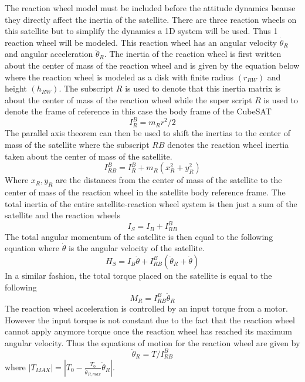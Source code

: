\documentclass{article}
\begin{document}
The reaction wheel model must be included before the attitude dynamics
beause they directly affect the inertia of the satellite. There are
three reaction wheels on this satellite but to simplify the dynamics a
1D system will be used. Thus 1 reaction wheel will be modeled. This
reaction wheel has an angular velocity $\dot{\theta}_{R}$ and angular acceleration
$\ddot{\theta}_{R}$. The inertia of the reaction wheel is first written
about the center of mass of the reaction wheel and is given by the
equation below where the reaction wheel is modeled as a disk with
finite radius $(r_{RW})$ and height $(h_{RW})$. The subscript $R$ is used to
denote that this inertia matrix is about the center of mass of the
reaction wheel while the super script $R$ is used to denote the frame
of reference in this case the body frame of the CubeSAT 
\begin{equation}
  I^{B}_{R} = m_{R}r^2/2
\end{equation}
The parallel axis theorem can then be used to shift the inertias to
the center of mass of the satellite where the subscript $RB$ denotes
the reaction wheel inertia taken about the center of mass of the
satellite. 
\begin{equation}
  I^{B}_{RB} = I^{B}_{R} + m_{R}(x_R^2+y_R^2)
\end{equation}
Where $x_R,y_R$ are the distances from the center of mass of
the satellite to the center of mass of the reaction wheel in the
satellite body reference frame. The total inertia of the entire
satellite-reaction wheel system is then just a sum of the satellite
and the reaction wheels
\begin{equation}
   I_S = I_B + I^{B}_{RB}
\end{equation}
The total angular momentum of the satellite is then equal to the following
equation where $\dot{\theta}$ is the angular velocity of the
satellite. 
\begin{equation}
  H_S = I_B\dot{\theta} + I^{B}_{RB}(\dot{\theta}_{R}+\dot{\theta})
\end{equation}
In a similar fashion, the total torque placed on the satellite is
equal to the following
\begin{equation}
  M_{R} = I^{B}_{RB}\ddot{\theta}_{R}
\end{equation}
The reaction wheel acceleration is controlled by an input torque from
a motor. However the input torque is not constant due to the fact that
the reaction wheel cannot apply anymore torque once the reaction wheel
has reached its maximum angular velocity. Thus the equations of motion
for the reaction wheel are given by
\begin{equation}
  \ddot{\theta}_{R} = T/I^{B}_{RB}
\end{equation}
where $|T_{MAX}| = |T_0 -
\frac{T_0}{\dot{\theta}_{R,max}}\dot{\theta}_R|$. 
\end{document}
